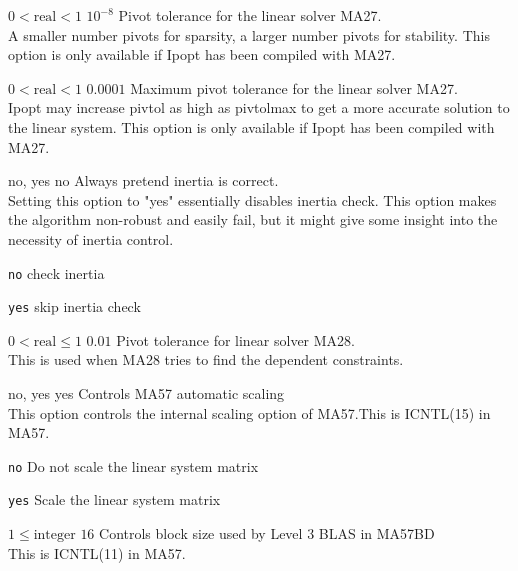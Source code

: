 %
{$0<\textrm{real}<1$}%
{$10^{- 8}$}%
{Pivot tolerance for the linear solver MA27.\\
A smaller number pivots for sparsity, a larger number pivots for stability.  This option is only available if Ipopt has been compiled with MA27.}%
{}

%
{$0<\textrm{real}<1$}%
{$0.0001$}%
{Maximum pivot tolerance for the linear solver MA27.\\
Ipopt may increase pivtol as high as pivtolmax to get a more accurate solution to the linear system.  This option is only available if Ipopt has been compiled with MA27.}%
{}

%
{\ttfamily no, yes}%
{no}%
{Always pretend inertia is correct.\\
Setting this option to "yes" essentially disables inertia check. This option makes the algorithm non-robust and easily fail, but it might give some insight into the necessity of inertia control.}%
{\begin{list}{}{
\setlength{\parsep}{0em}
\setlength{\leftmargin}{5ex}
\setlength{\labelwidth}{2ex}
\setlength{\itemindent}{0ex}
\setlength{\topsep}{0pt}}
\item[\texttt{no}] check inertia
\item[\texttt{yes}] skip inertia check
\end{list}
}

%
{$0<\textrm{real}\leq1$}%
{$0.01$}%
{Pivot tolerance for linear solver MA28.\\
This is used when MA28 tries to find the dependent constraints.}%
{}

%
{\ttfamily no, yes}%
{yes}%
{Controls MA57 automatic scaling\\
This option controls the internal scaling option of MA57.This is ICNTL(15) in MA57.}%
{\begin{list}{}{
\setlength{\parsep}{0em}
\setlength{\leftmargin}{5ex}
\setlength{\labelwidth}{2ex}
\setlength{\itemindent}{0ex}
\setlength{\topsep}{0pt}}
\item[\texttt{no}] Do not scale the linear system matrix
\item[\texttt{yes}] Scale the linear system matrix
\end{list}
}

%
{$1\leq\textrm{integer}$}%
{$16$}%
{Controls block size used by Level 3 BLAS in MA57BD\\
This is ICNTL(11) in MA57.}%
{}

